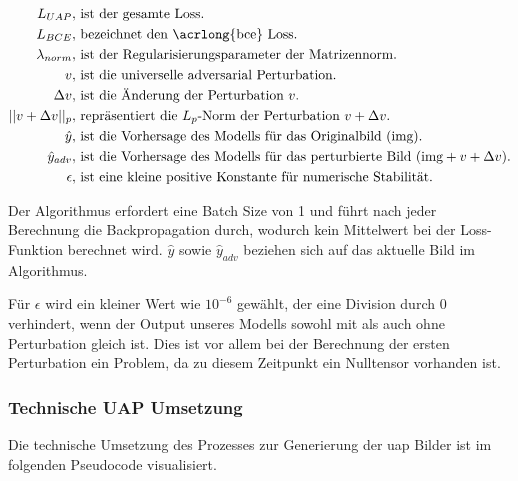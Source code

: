 \begin{align*}
L_{UAP}, &\text{ ist der gesamte Loss.} \\
L_{BCE}, &\text{ bezeichnet den \acrlong{bce} Loss.} \\
\lambda_{norm}, &\text{ ist der Regularisierungsparameter der Matrizennorm.} \\
v, &\text{ ist die universelle adversarial Perturbation.} \\
\Delta v, &\text{ ist die Änderung der Perturbation } v \text{.} \\
||v + \Delta v||_p, &\text{ repräsentiert die } L_p \text{-Norm der Perturbation } v + \Delta v. \\
\hat{y}, &\text{ ist die Vorhersage des Modells für das Originalbild ($\text{img}$).} \\
\hat{y}_{adv}, &\text{ ist die Vorhersage des Modells für das perturbierte Bild ($\text{img} + v + \Delta v$).} \\
\epsilon, &\text{ ist eine kleine positive Konstante für numerische Stabilität.}
\end{align*}

Der Algorithmus erfordert eine Batch Size von 1 und führt nach jeder Berechnung die Backpropagation durch, wodurch kein Mittelwert bei der Loss-Funktion berechnet wird. $\hat{y}$ sowie $\hat{y}_{adv}$ beziehen sich auf das aktuelle Bild im Algorithmus.

Für $\epsilon$ wird ein kleiner Wert wie $10^{-6}$ gewählt, der eine Division durch 0 verhindert, wenn der Output unseres Modells sowohl mit als auch ohne Perturbation gleich ist. Dies ist vor allem bei der Berechnung der ersten Perturbation ein Problem, da zu diesem Zeitpunkt ein Nulltensor vorhanden ist.

\subsubsection{Technische UAP Umsetzung} \label{chap:technische_umsetzung_uap}

Die technische Umsetzung des Prozesses zur Generierung der \acrshort{uap} Bilder ist im folgenden Pseudocode visualisiert.




